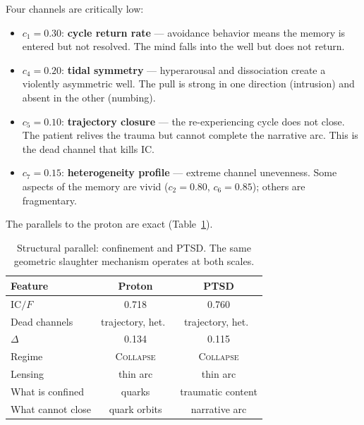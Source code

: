 \documentclass[
  aps,
  prd,
  twocolumn,
  superscriptaddress,
  nofootinbib,
  floatfix
]{revtex4-2}
\newcommand{\regime}[1]{\textrm{\upshape\scshape#1}}
\newcommand{\IC}{\mathrm{IC}}
\begin{document}
Four channels are critically low:
\begin{itemize}
\item $c_1 = 0.30$: \textbf{cycle return rate} --- avoidance
  behavior means the memory is entered but not resolved.
  The mind falls into the well but does not return.
\item $c_4 = 0.20$: \textbf{tidal symmetry} ---
  hyperarousal and dissociation create a violently
  asymmetric well.  The pull is strong in one direction
  (intrusion) and absent in the other (numbing).
\item $c_5 = 0.10$: \textbf{trajectory closure} --- the
  re-experiencing cycle does not close.  The patient
  relives the trauma but cannot complete the narrative arc.
  This is the dead channel that kills IC.
\item $c_7 = 0.15$: \textbf{heterogeneity profile} ---
  extreme channel unevenness.  Some aspects of the memory
  are vivid ($c_2 = 0.80$, $c_6 = 0.85$); others are
  fragmentary.
\end{itemize}

The parallels to the proton are exact (Table~\ref{tab:parallel}).

\begin{table}[t]
\caption{\label{tab:parallel}Structural parallel: confinement
and PTSD.  The same geometric slaughter mechanism operates at
both scales.}
\begin{ruledtabular}
\begin{tabular}{lcc}
Feature & Proton & PTSD \\
\hline
$\IC/F$ & 0.718 & 0.760 \\
Dead channels & trajectory, het.\ & trajectory, het.\ \\
$\Delta$ & 0.134 & 0.115 \\
Regime & \regime{Collapse} & \regime{Collapse} \\
Lensing & thin arc & thin arc \\
What is confined & quarks & traumatic content \\
What cannot close & quark orbits & narrative arc \\
\end{tabular}
\end{ruledtabular}
\end{table}
\end{document}
